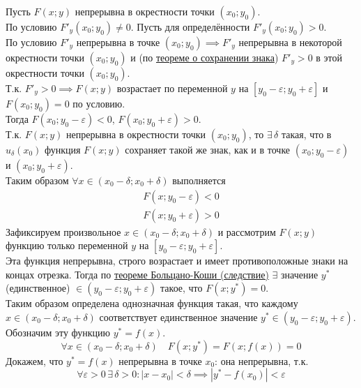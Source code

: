 \documentclass[12pt]{article}
\begin{document}
    \begin{adjustwidth}{1.5em}{1.5em}
        Пусть $F(x; y)$ непрерывна в окрестности точки $(x_0; y_0)$.\\
        По условию $F'_y(x_0; y_0) \ne 0$. Пусть для определённости $F'_y(x_0; y_0) > 0$.\\
        По условию $F'_y$ непрерывна в точке $(x_0; y_0) \implies F'_y$ непрерывна в некоторой окрестности точки $(x_0; y_0)$ и (по \hyperref[th:3.3.2]{теореме о сохранении знака}) $F'_y > 0$ в этой окрестности точки $(x_0; y_0)$.\\
        Т.к. $F'_y > 0 \implies F(x; y)$ возрастает по переменной $y$ на $[y_0 - \varepsilon; y_0 + \varepsilon]$ и $F(x_0; y_0) = 0$ по условию.\\
        Тогда $F(x_0; y_0 - \varepsilon) < 0$, $F(x_0; y_0 + \varepsilon) > 0$.\\
        Т.к. $F(x;y)$ непрерывна в окрестности точки $(x_0; y_0)$, то $\exists\, \delta$ такая, что в $u_\delta(x_0)$ функция $F(x; y)$ сохраняет такой же знак, как и в точке $(x_0; y_0 - \varepsilon)$ и $(x_0; y_0 + \varepsilon)$.\\
        Таким образом $\forall x \in (x_0 - \delta; x_0 + \delta)$ выполняется
        \begin{align*}
            F(x; y_0 - \varepsilon) < 0\\
            F(x; y_0 + \varepsilon) > 0
        \end{align*}
        Зафиксируем произвольное $x \in (x_0 - \delta; x_0 + \delta)$ и рассмотрим $F(x; y)$ функцию только переменной $y$ на $[ y_0 - \varepsilon; y_0 + \varepsilon ]$.\\
        Эта функция непрерывна, строго возрастает и имеет противоположные знаки на концах отрезка. Тогда по \hyperref[th:3.8.3]{теореме Больцано-Коши (следствие)} $\exists$ значение $y^*$ (единственное) $\in (y_0 - \varepsilon; y_0 + \varepsilon)$ такое, что $F(x; y^*) = 0$.\\
        Таким образом определена однозначная функция такая, что каждому $x \in (x_0 - \delta; x_0 + \delta)$ соответствует единственное значение $y^* \in (y_0 - \varepsilon; y_0 + \varepsilon)$.\\
        Обозначим эту функцию $y^* = f(x)$.
        \[ \forall x \in (x_0 - \delta; x_0 + \delta) \quad F(x; y^*) = F(x; f(x)) = 0 \]
        Докажем, что $y^* = f(x)$ непрерывна в точке $x_0$: она непрерывна, т.к. 
        \[ \forall \varepsilon > 0\,\exists\,\delta > 0 : |x - x_0| < \delta \implies |y^* - f(x_0)| < \varepsilon \]

\end{adjustwidth}
\end{document}
